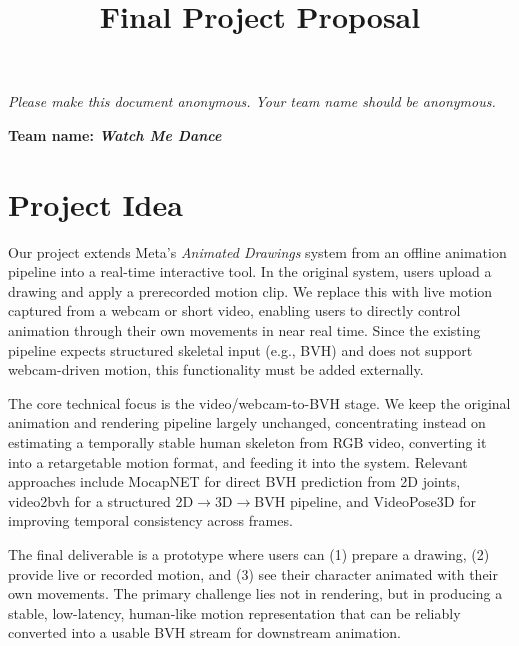 \pagestyle{fancy}
\fancyhf{}
\rfoot{\thepage}

\date{}

\title{\vspace{-1cm}Final Project Proposal}
\author{}


\maketitle
\vspace{-1cm}
\thispagestyle{fancy}

\emph{Please make this document anonymous. Your team name should be anonymous.}

\textbf{Team name: \emph{Watch Me Dance}}



\section*{Project Idea}

Our project extends Meta's \textit{Animated Drawings} system from an offline animation pipeline into a real-time interactive tool. In the original system, users upload a drawing and apply a prerecorded motion clip. We replace this with live motion captured from a webcam or short video, enabling users to directly control animation through their own movements in near real time. Since the existing pipeline expects structured skeletal input (e.g., BVH) and does not support webcam-driven motion, this functionality must be added externally.

The core technical focus is the video/webcam-to-BVH stage. We keep the original animation and rendering pipeline largely unchanged, concentrating instead on estimating a temporally stable human skeleton from RGB video, converting it into a retargetable motion format, and feeding it into the system. Relevant approaches include MocapNET for direct BVH prediction from 2D joints, video2bvh for a structured 2D$\rightarrow$3D$\rightarrow$BVH pipeline, and VideoPose3D for improving temporal consistency across frames.

The final deliverable is a prototype where users can (1) prepare a drawing, (2) provide live or recorded motion, and (3) see their character animated with their own movements. The primary challenge lies not in rendering, but in producing a stable, low-latency, human-like motion representation that can be reliably converted into a usable BVH stream for downstream animation.

